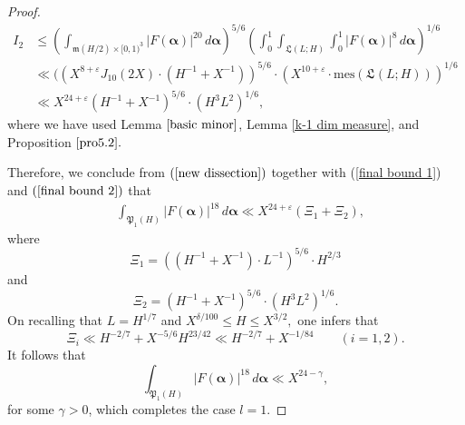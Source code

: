 \documentclass{amsart}%
\numberwithin{equation}{section}
\theoremstyle{remark}
\newcommand{\1}{\mathbbm{1}}
\newcommand{\balp}{\boldsymbol{\alpha}}
\begin{document}
\begin{proof}
\begin{equation}\label{final bound 2}
\begin{aligned}
   I_2  &\leq \left(\int_{\mathfrak{m}(H/2)\times [0,1)^3}|F(\boldsymbol{\alpha})|^{20}\, d\balp \right)^{5/6} \left(\int_0^1\int_{\mathfrak{L}^{}(L;H)}\int_0^1|F(\boldsymbol{\alpha})|^{8}\, d\balp \right)^{1/6}\\
    &\ll ((X^{8+\varepsilon}J_{10}(2X)\cdot\left(H^{-1}+X^{-1}\right))^{5/6}\cdot (X^{10+\varepsilon}\cdot \text{mes}(\mathfrak{L}^{}(L;H)))^{1/6}\\
   & \ll X^{24+\varepsilon}\left(H^{-1}+X^{-1}\right)^{5/6}\cdot (H^{3}L^2)^{1/6},
\end{aligned}
\end{equation}
where we have used Lemma $\ref{basic minor}$, Lemma  \ref{k-1 dim measure}, and Proposition $\ref{pro5.2}.$

Therefore, we conclude from $(\ref{new dissection})$ together with (\ref{final bound 1}) and $(\ref{final bound 2})$ that 
\begin{equation}\label{final bound 6}
\begin{aligned}
&\int_{\mathfrak{P}_1(H)}|F(\boldsymbol{\alpha})|^{18}\, d\balp \ll X^{24+\varepsilon}(\Xi_1+\Xi_2),
\end{aligned}
\end{equation}
where 
$$\Xi_1=\left(\left(H^{-1}+X^{-1}\right)\cdot L^{-1}\right)^{5/6}\cdot H^{2/3}$$
and
$$\Xi_2=\left(H^{-1}+X^{-1}\right)^{5/6}\cdot (H^{3}L^2)^{1/6}.$$
On recalling that $L=H^{1/7}$ and $X^{\delta/100}\leq H\leq X^{3/2},$ one infers that 
\begin{equation}\label{Xibd}
\Xi_i \ll H^{-2/7} + X^{-5/6}H^{23/42} \ll H^{-2/7} + X^{-1/84} \qquad (i=1,2).
\end{equation}
It follows that
\begin{equation}\label{final bound 8}
\int_{\mathfrak{P}_1(H)}|F(\boldsymbol{\alpha})|^{18}\, d\balp \ll X^{24-\gamma},
\end{equation}
for some $\gamma>0$, which completes the case $l=1.$


\end{proof}
\end{document}
